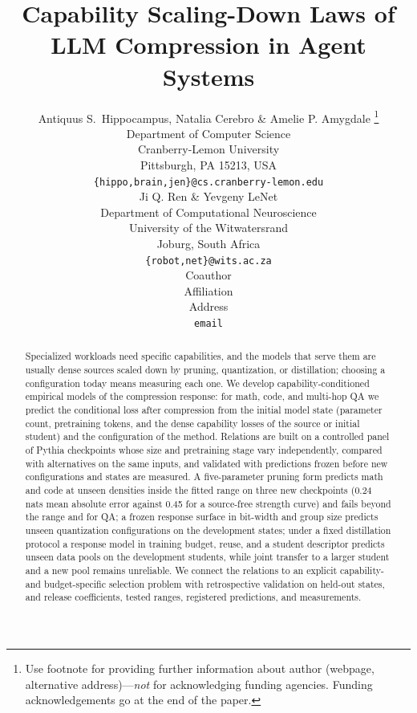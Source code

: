 \documentclass{article} %
\title{Capability Scaling-Down Laws of LLM Compression in Agent Systems}
\author{Antiquus S.~Hippocampus, Natalia Cerebro \& Amelie P. Amygdale \thanks{ Use footnote for providing further information
about author (webpage, alternative address)---\emph{not} for acknowledging
funding agencies.  Funding acknowledgements go at the end of the paper.} \\
Department of Computer Science\\
Cranberry-Lemon University\\
Pittsburgh, PA 15213, USA \\
\texttt{\{hippo,brain,jen\}@cs.cranberry-lemon.edu} \\
\And
Ji Q. Ren \& Yevgeny LeNet \\
Department of Computational Neuroscience \\
University of the Witwatersrand \\
Joburg, South Africa \\
\texttt{\{robot,net\}@wits.ac.za} \\
\AND
Coauthor \\
Affiliation \\
Address \\
\texttt{email}
}
\begin{document}
\maketitle

\begin{abstract}
Specialized workloads need specific capabilities, and the models that
serve them are usually dense sources scaled down by pruning,
quantization, or distillation; choosing a configuration today means
measuring each one. We develop capability-conditioned empirical models
of the compression response: for math, code, and multi-hop QA we
predict the conditional loss after compression from the initial model
state (parameter count, pretraining tokens, and the dense capability
losses of the source or initial student) and the configuration of the
method. Relations are built on a controlled panel of Pythia
checkpoints whose size and pretraining stage vary independently,
compared with alternatives on the same inputs, and validated with
predictions frozen before new configurations and states are measured.
A five-parameter pruning form predicts math and code at unseen
densities inside the fitted range on three new checkpoints (0.24 nats
mean absolute error against 0.45 for a source-free strength curve) and
fails beyond the range and for QA; a frozen response surface in
bit-width and group size predicts unseen quantization configurations
on the development states; under a fixed distillation protocol a
response model in training budget, reuse, and a student descriptor
predicts unseen data pools on the development students, while joint
transfer to a larger student and a new pool remains unreliable. We
connect the relations to an explicit capability- and budget-specific
selection problem with retrospective validation on held-out states,
and release coefficients, tested ranges, registered predictions, and
measurements.
\end{abstract}













\appendix

\end{document}
